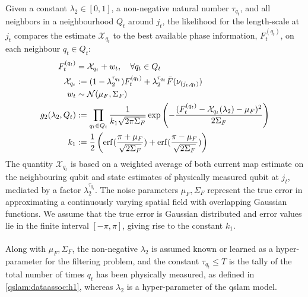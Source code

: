 \begin{defn}
	Given a constant $\lambda_2 \in [0,1]$, a non-negative natural number $\tau_{q_t}$, and all neighbors in a neighbourhood $Q_t$ around $j_t$, the likelihood for the length-scale at $j_t$ compares the estimate $\mathcal{X}_{q_t} $ to the best available phase information, $F_t^{(q_t)}$, on each neighbour $q_t \in Q_t$:
	\begin{align}
		F_t^{(q_t)} &= \mathcal{X}_{q_t} + w_t, \quad \forall q_t \in Q_t  \label{qslam:defn:msmtmodel:Rt}\\
		\mathcal{X}_{q_t} &:= (1 - \lambda_2^{\tau_{q_t}})F_t^{(q_t)} + \lambda_2^{\tau_{q_t}} \bar{F}(\nu_{(j_t,q_t)}) \label{qslam:defn:msmtmodel:Rt:Xqt} \\
		w_t & \sim \mathcal{N}(\mu_F, \Sigma_F) \\
		g_2(\lambda_2, Q_t) & := \prod_{q_t \in Q_t} \frac{1}{k_1\sqrt{2\pi \Sigma_F}} \exp \left( -\frac{( F_t^{(q_t)} - \mathcal{X}_{q_t}(\lambda_2) - \mu_F )^2}{2 \Sigma_F }\right) \label{qslam:defn:likelihood:Rt} \\
		k_1&:= \frac{1}{2}\left(\mathrm{erf}(\frac{\pi + \mu_F}{\sqrt{2\Sigma_F}}) + \mathrm{erf}(\frac{\pi - \mu_F}{\sqrt{2\Sigma_F}})\right)
	\end{align} The quantity $\mathcal{X}_{q_t}$ is based on a weighted average of both current map estimate on the neighbouring qubit and state estimates of physically measured qubit at $j_t$, mediated by a factor $\lambda_2^{\tau_{q_t}}$. The noise parameters $ \mu_F, \Sigma_F$ represent the true error in approximating a continuously varying spatial field with overlapping Gaussian functions. We assume that the true error is Gaussian distributed and error values lie in the finite interval $[-\pi, \pi]$, giving rise to the constant $k_1$. \\
	\\
	Along with $ \mu_F, \Sigma_F$, the non-negative $\lambda_2$ is assumed known or learned as a hyper-parameter for the filtering problem, and the constant $ \tau_{q_t} \leq T$  is the tally of the total number of times $q_t$ has been physically measured, as defined in \cref{qslam:dataassoc:h1}, whereas $\lambda_2$ is a hyper-parameter of the qslam model. 
\end{defn}


